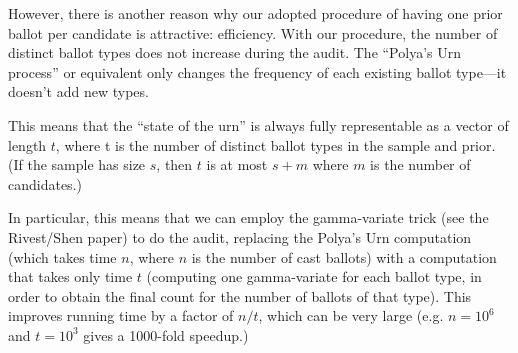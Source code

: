 \documentclass[10pt,a4paper]{article}
\begin{document}
{However, there is another reason why our adopted procedure 
of having one prior ballot per candidate is attractive: efficiency.
With our procedure, the number of distinct ballot types does
not increase during the audit.  The ``Polya's Urn process'' or
equivalent only changes the frequency of each existing ballot
type---it doesn't add new types.

This means that the ``state of the urn'' is always fully representable
as a vector of length $t$, where t is the number of distinct ballot
types in the sample and prior.  (If the sample has size $s$, then $t$
is at most $s+m$ where $m$ is the number of candidates.)

In particular, this means that we can employ the gamma-variate
trick (see the Rivest/Shen paper) to do the audit, replacing the Polya's Urn
computation (which takes time $n$, where $n$ is the number of cast
ballots) with a computation that takes only time $t$ (computing
one gamma-variate for each ballot type, in order to obtain the
final count for the number of ballots of that type).  This improves
running time by a factor of $n/t$, which can be very large (e.g.
$n=10^6$ and $t=10^3$ gives a 1000-fold speedup.)

} %
\end{document}
